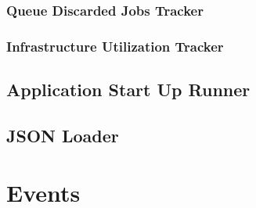 \subsubsection{Queue Discarded Jobs Tracker}

\subsubsection{Infrastructure Utilization Tracker}

\subsection{Application Start Up Runner}

\subsection{JSON Loader}

\section{Events}

